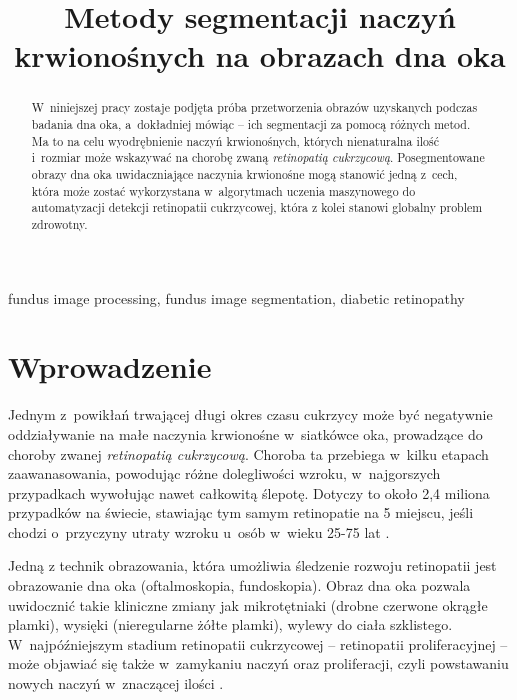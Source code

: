 \documentclass[conference]{IEEEtran}
\begin{document}
\title{Metody segmentacji naczyń krwionośnych na obrazach dna oka}

\author{
\and
{}
\and
{}
}

\maketitle

\begin{abstract}
W~niniejszej pracy zostaje podjęta próba przetworzenia obrazów uzyskanych podczas badania dna oka, a~dokładniej mówiąc -- ich segmentacji za pomocą różnych metod. Ma to na celu wyodrębnienie naczyń krwionośnych, których nienaturalna ilość i~rozmiar może wskazywać na chorobę zwaną \textit{retinopatią cukrzycową}. Posegmentowane obrazy dna oka uwidaczniające naczynia krwionośne mogą stanowić jedną z~cech, która może zostać wykorzystana w~algorytmach uczenia maszynowego do automatyzacji detekcji retinopatii cukrzycowej, która z kolei stanowi globalny problem zdrowotny.
\end{abstract}

\begin{IEEEkeywords}
fundus image processing, fundus image segmentation, diabetic retinopathy
\end{IEEEkeywords}

\section{Wprowadzenie}
Jednym z~powikłań trwającej długi okres czasu cukrzycy może być negatywnie oddziaływanie na małe naczynia krwionośne w~siatkówce oka, prowadzące do choroby zwanej \textit{retinopatią cukrzycową}. Choroba ta przebiega w~kilku etapach zaawanasowania, powodując różne dolegliwości wzroku, w~najgorszych przypadkach wywołując nawet całkowitą ślepotę. Dotyczy to około 2,4 miliona przypadków na świecie, stawiając tym samym retinopatie na 5 miejscu, jeśli chodzi o~przyczyny utraty wzroku u~osób w~wieku 25-75 lat \cite{b1}.

Jedną z technik obrazowania, która umożliwia śledzenie rozwoju retinopatii jest obrazowanie dna oka (oftalmoskopia, fundoskopia). Obraz dna oka pozwala uwidocznić takie kliniczne zmiany jak mikrotętniaki (drobne czerwone okrągłe plamki), wysięki (nieregularne żółte plamki), wylewy do ciała szklistego. W~najpóźniejszym stadium retinopatii cukrzycowej -- retinopatii proliferacyjnej -- może objawiać się także w~zamykaniu naczyń oraz proliferacji, czyli powstawaniu nowych naczyń w~znaczącej ilości \cite{b2}.
\end{document}

